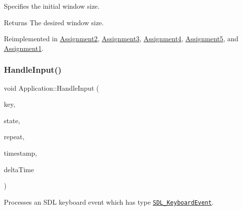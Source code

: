 Specifies the initial window size. 

\begin{DoxyReturn}{Returns}
The desired window size. 
\end{DoxyReturn}


Reimplemented in \hyperlink{class_assignment2_a9ea79bd468c12dde5159ca7b8efd8e1e}{Assignment2}, \hyperlink{class_assignment3_aec48ba5500d906963fdac555ee47cb72}{Assignment3}, \hyperlink{class_assignment4_ad197b75e730f9b32458429df8d55458e}{Assignment4}, \hyperlink{class_assignment5_ac199b6149ffa3dbedc7e0d49bb24c628}{Assignment5}, and \hyperlink{class_assignment1_a581b6c897c918eede3f9bbb1cbc50320}{Assignment1}.

\hypertarget{class_application_ae6074c3f102de1cb2fe4c81b545679db}{}\label{class_application_ae6074c3f102de1cb2fe4c81b545679db} 
\subsubsection{\texorpdfstring{Handle\+Input()}{HandleInput()}}
{\footnotesize\ttfamily void Application\+::\+Handle\+Input (\begin{DoxyParamCaption}\item[{S\+D\+L\+\_\+\+Keysym}]{key,  }\item[{Uint32}]{state,  }\item[{Uint8}]{repeat,  }\item[{double}]{timestamp,  }\item[{double}]{delta\+Time }\end{DoxyParamCaption})\hspace{0.3cm}{\ttfamily [virtual]}}



Processes an S\+DL keyboard event which has type \href{https://wiki.libsdl.org/SDL_KeyboardEvent}{\tt S\+D\+L\+\_\+\+Keyboard\+Event}. 


